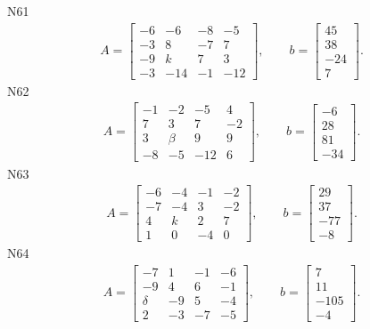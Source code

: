 \documentclass[11pt]{report}
\begin{document}
N61
\begin{align*}
 A = \left[\begin{matrix}-6 & -6 & -8 & -5\\-3 & 8 & -7 & 7\\-9 & k & 7 & 3\\-3 & -14 & -1 & -12\end{matrix}\right],
\qquad b = \left[\begin{matrix}45\\38\\-24\\7\end{matrix}\right]. 
 \end{align*}
N62
\begin{align*}
 A = \left[\begin{matrix}-1 & -2 & -5 & 4\\7 & 3 & 7 & -2\\3 & \beta & 9 & 9\\-8 & -5 & -12 & 6\end{matrix}\right],
\qquad b = \left[\begin{matrix}-6\\28\\81\\-34\end{matrix}\right]. 
 \end{align*}
N63
\begin{align*}
 A = \left[\begin{matrix}-6 & -4 & -1 & -2\\-7 & -4 & 3 & -2\\4 & k & 2 & 7\\1 & 0 & -4 & 0\end{matrix}\right],
\qquad b = \left[\begin{matrix}29\\37\\-77\\-8\end{matrix}\right]. 
 \end{align*}
N64
\begin{align*}
 A = \left[\begin{matrix}-7 & 1 & -1 & -6\\-9 & 4 & 6 & -1\\\delta & -9 & 5 & -4\\2 & -3 & -7 & -5\end{matrix}\right],
\qquad b = \left[\begin{matrix}7\\11\\-105\\-4\end{matrix}\right]. 
 \end{align*}
\end{document}
